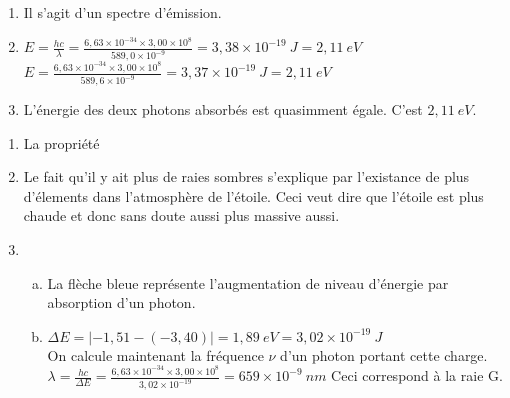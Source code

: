 \documentclass[12pt, a4paper]{article}
\begin{document}
    \begin{Exercise}[number={23}]
        \begin{enumerate}[1.]
            \item	Il s'agit d'un spectre d'émission.
            \item   $E=\frac{hc}{\lambda}=\frac{6{,}63\times 10^{-34}\times 3{,}00\times 10^{8}}{589{,}0\times 10^{-9}}=3{,}38\times 10^{-19}\ \si{J}=2{,}11\ \si{eV}$ \\ $E=\frac{6{,}63\times 10^{-34}\times 3{,}00\times 10^{8}}{589{,}6\times 10^{-9}}=3{,}37\times 10^{-19}\ \si{J}=2{,}11\ \si{eV}$
            \item   L'énergie des deux photons absorbés est quasimment égale. C'est $2{,}11\ \si{eV}$.
        \end{enumerate}
    \end{Exercise}

    \begin{Exercise}[number={29}]
        \begin{enumerate}[1.]
            \item	La propriété
            \item   Le fait qu'il y ait plus de raies sombres s'explique par l'existance de plus d'élements dans l'atmosphère de l'étoile. Ceci veut dire que l'étoile est plus chaude et donc sans doute aussi plus massive aussi.
            \item   \begin{enumerate}[a.]
                        \item	La flèche bleue représente l'augmentation de niveau d'énergie par absorption d'un photon.
                        \item   $\Delta E=\lvert -1{,}51-(-3{,}40) \rvert=1{,}89\ \si{eV}=3{,}02\times 10^{-19}\ \si{J}$ \\ On calcule maintenant la fréquence $\nu$ d'un photon portant cette charge. \\ $\lambda=\frac{hc}{\Delta E}=\frac{6{,}63\times 10^{-34}\times 3{,}00\times 10^{8}}{3{,}02\times 10^{-19}}=659\times 10^{-9}\ \si{nm}$ \quad Ceci correspond à la raie G.
                    \end{enumerate}
        \end{enumerate}
    \end{Exercise}
\end{document}
